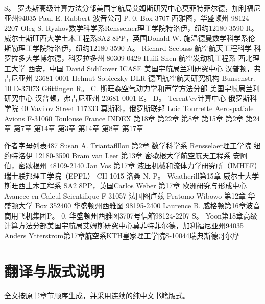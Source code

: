 \documentclass[UTF8,11pt,a4paper,openany,fontset=fandol]{ctexbook}
\begin{document}
S。 罗杰斯高级计算方法分部美国宇航局艾姆斯研究中心莫菲特菲尔德，加利福尼亚州94035 Paul E. Rubbert 波音公司 P. 0. Box 3707 西雅图，华盛顿州 98124-2207 Oleg S. Ryzhov数学科学系Rensselaer理工学院特洛伊，纽约12180-3590 R。 威尔士斯旺西大学土木工程系SA2 8PP，英国Donald W. 施温德曼数学科学系伦斯勒理工学院特洛伊，纽约12180-3590 A。 Richard Seebass 航空航天工程科学 科罗拉多大学博尔德，科罗拉多州 80309-0429 Huili Shen 航空发动机工程系 西北理工大学 西安，中国 David Sidilkover ICASE 美国宇航局兰利研究中心 汉普顿，弗吉尼亚州 23681-0001 Helmut Sobieczky DLR 德国航空航天研究机构 Bunsenstr. 10 D-37073 Gfittingen R。 C. 斯旺森空气动力学和声学方法分部 美国宇航局兰利研究中心 汉普顿，弗吉尼亚州 23681-0001 E。 D。 Terent'ev计算中心 俄罗斯科学院 40 Vavilov Street 117333 莫斯科，俄罗斯联邦 Loic Tourrette Aerospatiale Avions F-31060 Toulouse France INDEX 第18章 第22章 第8章 第15章 第2章 第24章 第7章 第14章 第3章 第14章 第8章 第17章

作者字母列表487 Susan A. Triantaflllou 第2章 数学科学系 Rensselaer理工学院 纽约特洛伊 12180-3590 Bram van Leer 第13章 密歇根大学航空航天工程系 安阿伯，密歇根州 48109-2140 Jan Vos 第17章 液压机械和流体力学研究所（IMHEF） 瑞士联邦理工学院（EPFL） CH-1015 洛桑 N. P。 Weatherill第15章 威尔士大学斯旺西土木工程系 SA2 8PP，英国Carlos Weber 第17章 欧洲研究与形成中心 Avancee en Calcul Scientifique F-31057 法国图卢兹 Pratomo Wibowo 第12章 华盛顿大学 Box 352400 华盛顿州西雅图 98195-2400 Laurence B. 威格顿第16章波音商用飞机集团P。 0. 华盛顿州西雅图3707号信箱98124-2207 S。 Yoon第18章高级计算方法分部美国宇航局艾姆斯研究中心莫菲特菲尔德，加利福尼亚州94035 Anders Ytterstrom第17章航空系KTH皇家理工学院S-10044瑞典斯德哥尔摩

\backmatter
\chapter*{翻译与版式说明}
全文按原书章节顺序生成，并采用连续的纯中文书籍版式。
\end{document}

